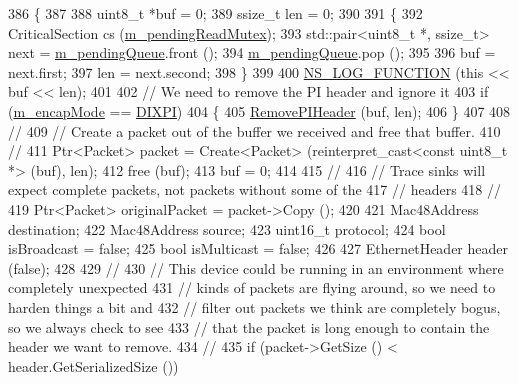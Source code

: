 \begin{DoxyCode}
386 \{
387 
388   uint8\_t *buf = 0; 
389   ssize\_t len = 0;
390 
391   \{
392     CriticalSection cs (\hyperlink{classns3_1_1FdNetDevice_a957f57e977ee857a0233a484c276d427}{m\_pendingReadMutex});
393     std::pair<uint8\_t *, ssize\_t> next = \hyperlink{classns3_1_1FdNetDevice_a58492550a84c8c2c959b4d4904342d70}{m\_pendingQueue}.front ();
394     \hyperlink{classns3_1_1FdNetDevice_a58492550a84c8c2c959b4d4904342d70}{m\_pendingQueue}.pop ();
395 
396     buf = next.first;
397     len = next.second;
398   \}
399 
400   \hyperlink{log-macros-disabled_8h_a90b90d5bad1f39cb1b64923ea94c0761}{NS\_LOG\_FUNCTION} (\textcolor{keyword}{this} << buf << len);
401 
402   \textcolor{comment}{// We need to remove the PI header and ignore it}
403   \textcolor{keywordflow}{if} (\hyperlink{classns3_1_1FdNetDevice_aa5d97abfd57576f6b80423ac764e5cc8}{m\_encapMode} == \hyperlink{classns3_1_1FdNetDevice_abdacbf10c181f50998a98e7688016618abbad9c0d0fe0604652f21e33cf4d8798}{DIXPI})
404     \{
405       \hyperlink{group__fd-net-device_ga297e68cd3a421ef11540f26b073ea881}{RemovePIHeader} (buf, len);
406     \}
407 
408   \textcolor{comment}{//}
409   \textcolor{comment}{// Create a packet out of the buffer we received and free that buffer.}
410   \textcolor{comment}{//}
411   Ptr<Packet> packet = Create<Packet> (\textcolor{keyword}{reinterpret\_cast<}\textcolor{keyword}{const }uint8\_t *\textcolor{keyword}{>} (buf), len);
412   free (buf);
413   buf = 0;
414 
415   \textcolor{comment}{//}
416   \textcolor{comment}{// Trace sinks will expect complete packets, not packets without some of the}
417   \textcolor{comment}{// headers}
418   \textcolor{comment}{//}
419   Ptr<Packet> originalPacket = packet->Copy ();
420 
421   Mac48Address destination;
422   Mac48Address source;
423   uint16\_t protocol;
424   \textcolor{keywordtype}{bool} isBroadcast = \textcolor{keyword}{false};
425   \textcolor{keywordtype}{bool} isMulticast = \textcolor{keyword}{false};
426 
427   EthernetHeader header (\textcolor{keyword}{false});
428 
429   \textcolor{comment}{//}
430   \textcolor{comment}{// This device could be running in an environment where completely unexpected}
431   \textcolor{comment}{// kinds of packets are flying around, so we need to harden things a bit and}
432   \textcolor{comment}{// filter out packets we think are completely bogus, so we always check to see}
433   \textcolor{comment}{// that the packet is long enough to contain the header we want to remove.}
434   \textcolor{comment}{//}
435   \textcolor{keywordflow}{if} (packet->GetSize () < header.GetSerializedSize ())

\end{DoxyCode}

